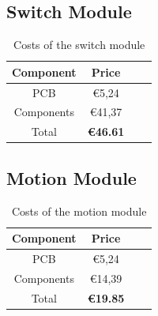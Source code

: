         \subsection{Switch Module}
    
        \begin{table}[H]
            \centering
            \begin{tabular}{|c|c|c|c|}
                \hline
                \textbf{Component} & \textbf{Price}  \\
                \hline
                PCB   & €5,24 \\
                \hline
                Components  & €41,37 \\
                \hline
                Total  & \textbf{€46.61} \\
                \hline
            \end{tabular}
            \caption{Costs of the switch module}
            \label{tab:costs-switch-module}
        \end{table}

        \subsection{Motion Module}
    
        \begin{table}[H]
            \centering
            \begin{tabular}{|c|c|c|c|}
                \hline
                \textbf{Component} & \textbf{Price}  \\
                \hline
                PCB   & €5,24 \\
                \hline
                Components  & €14,39  \\
                \hline
                Total  & \textbf{€19.85} \\
                \hline
            \end{tabular}
            \caption{Costs of the motion module}
            \label{tab:costs-motion-module}
        \end{table}
